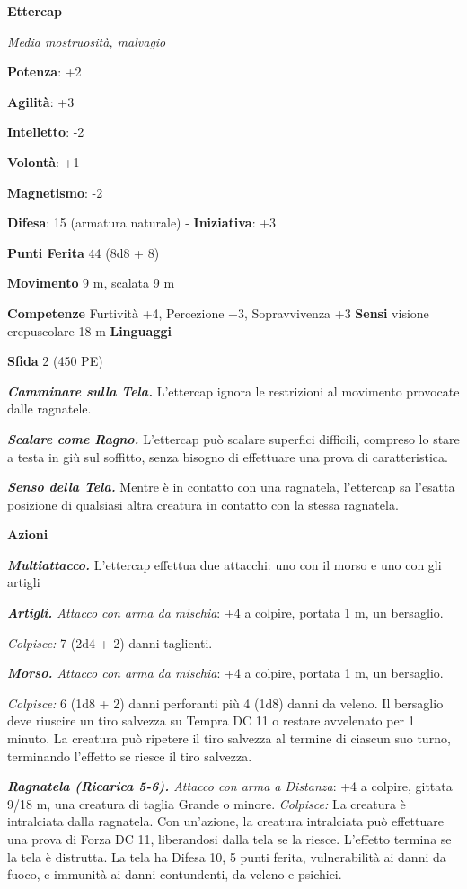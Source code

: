 \begin{multicols}{2}
\textbf{Ettercap}

\emph{Media mostruosità, malvagio}

\textbf{Potenza}: +2

\textbf{Agilità}: +3

\textbf{Intelletto}: -2

\textbf{Volontà}: +1

\textbf{Magnetismo}: -2

\textbf{Difesa}: 15 (armatura naturale) - \textbf{Iniziativa}: +3

\textbf{Punti Ferita} 44 (8d8 + 8)

\textbf{Movimento} 9 m, scalata 9 m

\textbf{Competenze} Furtività +4, Percezione +3, Sopravvivenza +3
\textbf{Sensi} visione crepuscolare 18 m
\textbf{Linguaggi} -

\textbf{Sfida} 2 (450 PE)\smallskip

\emph{\textbf{Camminare sulla Tela.}} L'ettercap ignora le restrizioni
al movimento provocate dalle ragnatele.

\emph{\textbf{Scalare come Ragno.}} L'ettercap può scalare superfici
difficili, compreso lo stare a testa in giù sul soffitto, senza bisogno
di effettuare una prova di caratteristica.

\emph{\textbf{Senso della Tela.}} Mentre è in contatto con una
ragnatela, l'ettercap sa l'esatta posizione di qualsiasi altra creatura
in contatto con la stessa ragnatela.

\smallskip\textbf{Azioni}

\emph{\textbf{Multiattacco.}} L'ettercap effettua due attacchi: uno con
il morso e uno con gli artigli

\emph{\textbf{Artigli.} Attacco con arma da mischia}: +4 a colpire,
portata 1 m, un bersaglio.

\emph{Colpisce:} 7 (2d4 + 2) danni taglienti.

\emph{\textbf{Morso.} Attacco con arma da mischia}: +4 a colpire,
portata 1 m, un bersaglio.

\emph{Colpisce:} 6 (1d8 + 2) danni perforanti più 4 (1d8) danni da
veleno. Il bersaglio deve riuscire un tiro salvezza su Tempra DC
11 o restare avvelenato per 1 minuto. La creatura può ripetere il tiro
salvezza al termine di ciascun suo turno, terminando l'effetto se riesce
il tiro salvezza.

\emph{\textbf{Ragnatela (Ricarica 5-6).} Attacco con arma a Distanza}:
+4 a colpire, gittata 9/18 m, una creatura di taglia Grande o minore.
\emph{Colpisce:} La creatura è intralciata dalla ragnatela. Con
un'azione, la creatura intralciata può effettuare una prova di Forza DC
11, liberandosi dalla tela se la riesce. L'effetto termina se la tela è
distrutta. La tela ha Difesa 10, 5 punti ferita, vulnerabilità ai danni da
fuoco, e immunità ai danni contundenti, da veleno e psichici.


\end{multicols}
